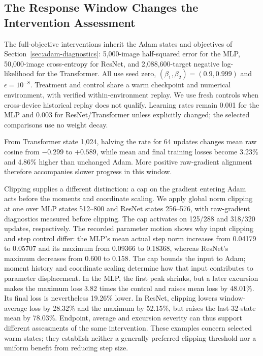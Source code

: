 \subsection{The Response Window Changes the Intervention Assessment}

The full-objective interventions inherit the Adam states and objectives
of Section~\ref{sec:adam-diagnostics}: 5,000-image half-squared error for
the MLP, 50,000-image cross-entropy for ResNet, and 2,088,600-target
negative log-likelihood for the Transformer. All use seed zero,
$(\beta_1,\beta_2)=(0.9,0.999)$ and $\epsilon=10^{-8}$.
Treatment and control share a warm checkpoint and numerical environment,
with verified within-environment replay. We use fresh controls when
cross-device historical replay does not qualify. Learning rates remain
0.001 for the MLP and 0.003 for ResNet/Transformer unless explicitly changed;
the selected comparisons use no weight decay.

From Transformer state 1,024, halving the rate for 64 updates changes mean
raw cosine from $-0.299$ to $+0.589$, while mean and final training losses
become 3.23\% and 4.86\% higher than unchanged Adam. More positive
raw-gradient alignment therefore accompanies slower progress in this window.

Clipping supplies a different distinction: a cap on the gradient entering
Adam acts before the moments and coordinate scaling. We apply global
norm clipping at one over MLP states 512--800 and ResNet states 256--576,
with raw-gradient diagnostics measured before clipping. The cap activates
on 125/288 and 318/320 updates, respectively. The recorded parameter motion
shows why input clipping and step control differ: the MLP's mean actual
step norm increases from 0.04179 to 0.05707 and its maximum from 0.09366
to 0.18368, whereas ResNet's maximum decreases from 0.600 to 0.158.
The cap bounds the input to Adam; moment history and coordinate scaling
determine how that input contributes to parameter displacement.
In the MLP, the first peak
shrinks, but a later excursion makes the maximum loss 3.82 times the
control and raises mean loss by 48.01\%. Its final loss is nevertheless
19.26\% lower. In ResNet, clipping lowers window-average loss by 28.32\%
and the maximum by 52.15\%, but raises the last-32-state mean by 78.03\%.
Endpoint, average and excursion severity can thus support different
assessments of the same intervention. These examples concern selected
warm states; they establish neither a generally preferred clipping
threshold nor a uniform benefit from reducing step size.

